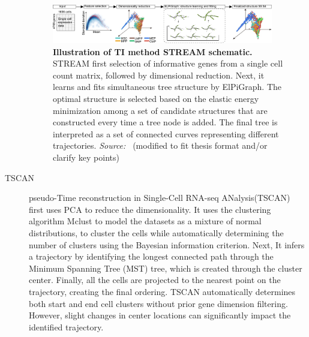 \begin{description}
  \begin{figure}[ht!]
  	\centering
  	\includegraphics[width=0.95\textwidth]{TI_Alg_STREAM/fig}
  	\vspace{0.1cm}
  	\caption[Illustration of TI method STREAM schematic.]{\textbf{Illustration of TI method STREAM schematic.} STREAM first selection of informative genes from a single cell count matrix, followed by dimensional reduction. Next, it learns and fits simultaneous tree structure by ElPiGraph. The optimal structure is selected based on the elastic energy minimization among a set of candidate structures that are constructed every time a tree node is added. The final tree is interpreted as a set of connected curves representing different trajectories. \emph{Source:~\cite{chen2019stream}} (modified to fit thesis format and/or clarify key points)
  	}
  	\label{fig:TI_Alg_STREAM}
  \end{figure}

  \item[TSCAN]
  pseudo-Time reconstruction in Single-Cell RNA-seq ANalysis(TSCAN)~\citep{ji2016tscan} first uses PCA to reduce the dimensionality. It uses the clustering algorithm Mclust to model the datasets as a mixture of normal distributions, to cluster the cells while automatically determining the number of clusters using the Bayesian information criterion. Next, It infers a trajectory by identifying the longest connected path through the Minimum Spanning Tree (MST) tree, which is created through the cluster center. Finally, all the cells are projected to the nearest point on the trajectory, creating the final ordering. TSCAN automatically determines both start and end cell clusters without prior gene dimension filtering. However, slight changes in center locations can significantly impact the identified trajectory.


\end{description}
